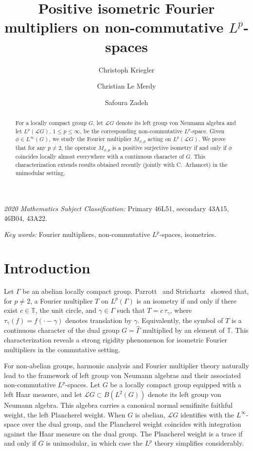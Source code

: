 \documentclass[12pt]{amsart}
\author[C. Kriegler]{Christoph Kriegler}
\author[C. Le Merdy]{Christian Le Merdy}
\author[S. Zadeh]{Safoura Zadeh}
\theoremstyle{remark}
\theoremstyle{definition}
\numberwithin{equation}{section}
\begin{document}
\title{Positive isometric Fourier multipliers on non-commutative $L^p$-spaces}



\begin{abstract}
For a locally compact group \(G\), let \(\mathcal{L}G\) denote its left group von Neumann algebra and let \(L^p(\mathcal{L}G)\), \(1 \le p \le \infty\), be the corresponding non-commutative \(L^p\)-space. Given \(\phi \in L^\infty(G)\), we study the Fourier multiplier \(M_{\phi,p}\) acting on \(L^p(\mathcal{L}G)\). We prove that for any \(p \neq 2\), the operator \(M_{\phi,p}\) is a positive surjective isometry if and only if \(\phi\) coincides locally almost everywhere with a continuous character of \(G\). This characterization extends results obtained recently (jointly with C.~Arhancet) in the unimodular setting.
\end{abstract}

\maketitle


\noindent
{\it 2020 Mathematics Subject Classification:} Primary 46L51, secondary	43A15, 46B04, 43A22.


\smallskip
\noindent
{\it Key words:} Fourier multipliers, 
non-commutative $L^p$-spaces, isometries. 






\bigskip
\section{Introduction}\label{1}

\noindent Let $\Gamma$ be an abelian locally compact group. Parrott~\cite{Par} and Strichartz~\cite{St} showed that, for $p \neq 2$, a Fourier multiplier $T$ on $L^p(\Gamma)$ is an isometry if and only if there exist $c \in \mathbb{T}$, the unit circle, and $\gamma \in \Gamma$ such that \(T = c\,\tau_\gamma\), where $\tau_\gamma(f) = f(\cdot - \gamma)$ denotes translation by $\gamma$. Equivalently, the symbol of $T$ is a continuous character of the dual group $G = \widehat{\Gamma}$ multiplied by an element of $\mathbb{T}$. This characterization reveals a strong rigidity phenomenon for isometric Fourier multipliers in the commutative setting.

For non-abelian groups, harmonic analysis and Fourier multiplier theory naturally lead to the framework of left group von Neumann algebras and their associated non-commutative $L^p$-spaces. Let $G$ be a locally compact group equipped with a left Haar measure, and let $\mathcal L G\subset B(L^2(G))$ denote its left group von Neumann algebra. This algebra carries a canonical normal semifinite faithful weight, the left Plancherel weight. When $G$ is abelian, $\mathcal L G$ identifies with the $L^\infty$-space over the dual group, and the Plancherel weight coincides with integration against the Haar measure on the dual group. The Plancherel weight is a trace if and only if $G$ is unimodular, in which case the $L^p$ theory simplifies considerably.
\end{document}
